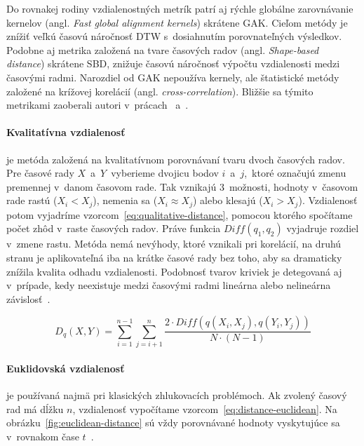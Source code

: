 \documentclass[a4paper,twoside,slovak,12pt,appendix]{article}
\begin{document}
\label{c:distance-metrics-gak}
\noindent
Do rovnakej rodiny vzdialenostných metrík patrí aj rýchle globálne zarovnávanie
kernelov (angl. \textit{Fast global alignment kernels}) skrátene GAK. Cieľom
metódy je znížiť veľkú časovú náročnosť DTW s~dosiahnutím porovnateľných
výsledkov. Podobne aj metrika založená na tvare časových radov (angl.
\textit{Shape-based distance}) skrátene SBD, znižuje časovú náročnosť výpočtu
vzdialenosti medzi časovými radmi. Narozdiel od GAK nepoužíva kernely, ale
štatistické metódy založené na krížovej korelácií (angl.
\textit{cross-correlation}). Bližšie sa týmito metrikami zaoberali autori
v~prácach~\cite{Cuturi2011} a~\cite{Paparrizos2016}.

\paragraph{Kvalitatívna vzdialenosť} je metóda založená na kvalitatívnom
porovnávaní tvaru dvoch časových radov. Pre časové rady $X$~a~$Y$~vyberieme
dvojicu bodov $i$~a~$j$,~ktoré označujú zmenu premennej v~danom časovom rade.
Tak vznikajú 3~možnosti, hodnoty v~časovom rade rastú ($X_i < X_j$), nemenia sa
($X_i \approx X_j$) alebo klesajú ($X_i > X_j$). Vzdialenosť potom vyjadríme
vzorcom~\ref{eq:qualitative-distance}, pomocou ktorého spočítame počet zhôd
v~raste časových radov. Práve funkcia $Diff(q_1, q_2)$ vyjadruje rozdiel v~zmene
rastu. Metóda nemá nevýhody, ktoré vznikali pri korelácií, na druhú stranu je
aplikovateľná iba na krátke časové rady bez toho, aby sa dramaticky znížila
kvalita odhadu vzdialenosti. Podobnosť tvarov kriviek je detegovaná aj
v~prípade, kedy neexistuje medzi časovými radmi lineárna alebo nelineárna
závislosť~\cite{Dzeroski2007}.

\begin{equation}
	\label{eq:qualitative-distance}
  D_q \left( X, Y \right) = \sum_{i=1}^{n-1} \sum_{j=i+1}^{n} \frac
  {2 \cdot Diff \left( q \left( X_i, X_j \right), q \left( Y_i, Y_j \right) \right) }
  {N \cdot \left( N - 1 \right)}
\end{equation}

\paragraph{Euklidovská vzdialenosť} je používaná najmä pri klasických
zhlukovacích problémoch. Ak zvolený časový rad má dĺžku $n$, vzdialenosť
vypočítame vzorcom~\ref{eq:distance-euclidean}. Na
obrázku~\ref{fig:euclidean-distance} sú vždy porovnávané hodnoty vyskytujúce sa
v~rovnakom čase $t$~\cite{WarrenLiao2005}.
\end{document}
